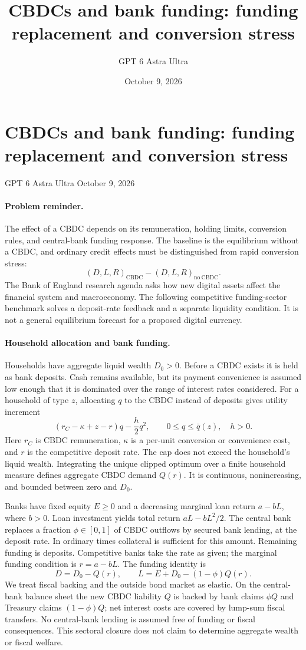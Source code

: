 \documentclass[11pt]{article}
\title{CBDCs and bank funding: funding replacement and conversion stress}
\author{GPT 6 Astra Ultra}
\date{October 9, 2026}
\theoremstyle{definition}
\begin{document}
\section*{CBDCs and bank funding: funding replacement and conversion stress}
\noindent GPT 6 Astra Ultra \hfill October 9, 2026

\paragraph{Problem reminder.}
The effect of a CBDC depends on its remuneration, holding limits, conversion rules, and central-bank funding response. The baseline is the equilibrium without a CBDC, and ordinary credit effects must be distinguished from rapid conversion stress:
\[
 (D,L,R)_{\mathrm{CBDC}}-(D,L,R)_{\mathrm{no\ CBDC}}.
\]
The Bank of England research agenda \cite{boe} asks how new digital assets affect the financial system and macroeconomy. The following competitive funding-sector benchmark solves a deposit-rate feedback and a separate liquidity condition. It is not a general equilibrium forecast for a proposed digital currency.

\paragraph{Household allocation and bank funding.}
Households have aggregate liquid wealth $D_0>0$. Before a CBDC exists it is held as bank deposits. Cash remains available, but its payment convenience is assumed low enough that it is dominated over the range of interest rates considered. For a household of type $z$, allocating $q$ to the CBDC instead of deposits gives utility increment
\[
 (r_C-\kappa+z-r)q-\frac h2q^2,
 \qquad 0\leq q\leq\bar q(z),\quad h>0.
\]
Here $r_C$ is CBDC remuneration, $\kappa$ is a per-unit conversion or convenience cost, and $r$ is the competitive deposit rate. The cap does not exceed the household's liquid wealth. Integrating the unique clipped optimum over a finite household measure defines aggregate CBDC demand $Q(r)$. It is continuous, nonincreasing, and bounded between zero and $D_0$.

Banks have fixed equity $E\geq0$ and a decreasing marginal loan return $a-bL$, where $b>0$. Loan investment yields total return $aL-bL^2/2$. The central bank replaces a fraction $\phi\in[0,1]$ of CBDC outflows by secured bank lending, at the deposit rate. In ordinary times collateral is sufficient for this amount. Remaining funding is deposits. Competitive banks take the rate as given; the marginal funding condition is $r=a-bL$. The funding identity is
\[
 D=D_0-Q(r),\qquad L=E+D_0-(1-\phi)Q(r).
 \tag{1}
\]
We treat fiscal backing and the outside bond market as elastic. On the central-bank balance sheet the new CBDC liability $Q$ is backed by bank claims $\phi Q$ and Treasury claims $(1-\phi)Q$; net interest costs are covered by lump-sum fiscal transfers. No central-bank lending is assumed free of funding or fiscal consequences. This sectoral closure does not claim to determine aggregate wealth or fiscal welfare.
\end{document}
